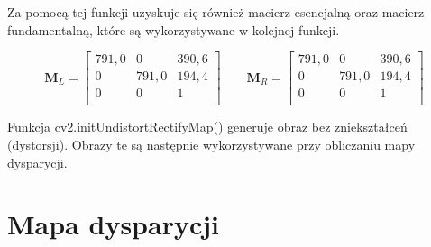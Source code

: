 \documentclass[magisterska]{pracadypl}
\begin{document}
Za pomocą tej funkcji uzyskuje się również macierz esencjalną oraz macierz fundamentalną, które są wykorzystywane w kolejnej funkcji.

\[
\mathbf{M}_L =
\begin{bmatrix}
791,0 & 0 & 390,6 \\
0 & 791,0 & 194,4 \\
0 & 0 & 1 \\
\end{bmatrix}
\qquad
\mathbf{M}_R =
\begin{bmatrix}
791,0 & 0 & 390,6 \\
0 & 791,0 & 194,4 \\
0 & 0 & 1 \\
\end{bmatrix}
\]

Funkcja cv2.initUndistortRectifyMap() generuje obraz bez zniekształceń (dystorsji). Obrazy te są następnie wykorzystywane przy obliczaniu mapy dysparycji.

\section{Mapa dysparycji}
\end{document}

